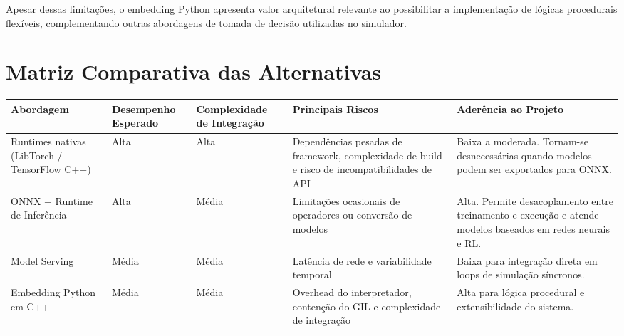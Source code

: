 Apesar dessas limitações, o embedding Python apresenta valor arquitetural relevante ao
possibilitar a implementação de lógicas procedurais flexíveis, complementando outras
abordagens de tomada de decisão utilizadas no simulador.

\section{Matriz Comparativa das Alternativas}

\begin{center}
\renewcommand{\arraystretch}{1.4}

\begin{tabular}{|p{3cm}|p{2.5cm}|p{3cm}|p{3.5cm}|p{3cm}|}
\hline
\textbf{Abordagem} &
\textbf{Desempenho Esperado} &
\textbf{Complexidade de Integração} &
\textbf{Principais Riscos} &
\textbf{Aderência ao Projeto} \\
\hline

Runtimes nativas
(LibTorch / TensorFlow C++)

& Alta

& Alta

& Dependências pesadas de framework,
complexidade de build e risco de incompatibilidades de API

& Baixa a moderada.
Tornam-se desnecessárias quando modelos podem ser exportados para ONNX. \\

\hline

ONNX + Runtime de Inferência

& Alta

& Média

& Limitações ocasionais de operadores ou conversão de modelos

& Alta.
Permite desacoplamento entre treinamento e execução e atende
modelos baseados em redes neurais e RL. \\

\hline

Model Serving

& Média

& Média

& Latência de rede e variabilidade temporal

& Baixa para integração direta em loops de simulação síncronos. \\

\hline

Embedding Python em C++

& Média

& Média

& Overhead do interpretador,
contenção do GIL e complexidade de integração

& Alta para lógica procedural e extensibilidade do sistema. \\

\hline

\end{tabular}
\end{center}

